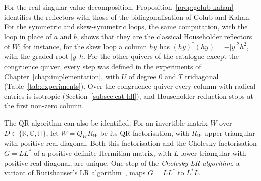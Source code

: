 \documentclass[12pt, a4paper]{report}
\theoremstyle{plain}
\theoremstyle{definition}
\theoremstyle{remark}
\theoremstyle{plain}
\newcommand{\RR}{\mathbb{R}}
\newcommand{\CC}{\mathbb{C}}
\newcommand{\HH}{\mathbb{H}}
\begin{document}
For the real singular value decomposition, Proposition~\ref{prop:golub-kahan} identifies the reflectors with those of the bidiagonalisation of Golub and Kahan. For the symmetric and skew-symmetric loops, the same computation, with the loop in place of $a$ and $b$, shows that they are the classical Householder reflectors of $W$; for instance, for the skew loop a column $hy$ has $(hy)^*(hy)=-|y|^2h^2$, with the graded root $|y|\,h$. For the other quivers of the catalogue except the congruence quiver, every step was defined in the experiments of Chapter~\ref{chap:implementation}, with $U$ of degree $0$ and $T$ tridiagonal (Table~\ref{tab:experiments}). Over the congruence quiver every column with radical entries is isotropic (Section~\ref{subsec:cat-ldl}), and Householder reduction stops at the first non-zero column.

The QR algorithm can also be identified. For an invertible matrix $W$ over $D\in\{\RR,\CC,\HH\}$, let $W=Q_WR_W$ be its QR factorisation, with $R_W$ upper triangular with positive real diagonal. Both this factorisation and the Cholesky factorisation $G=LL^*$ of a positive definite Hermitian matrix, with $L$ lower triangular with positive real diagonal, are unique. One step of the \emph{Cholesky LR algorithm}, a variant of Rutishauser's LR algorithm~\cite{Rutishauser1958}, maps $G=LL^*$ to $L^*L$.
\end{document}
